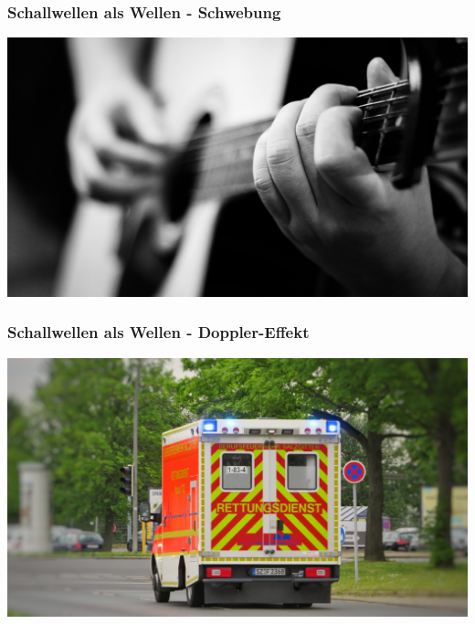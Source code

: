 \documentclass{beamer}
\begin{document}
\begin{frame}
\frametitle{Schallwellen als Wellen - Schwebung}

\begin{center}
\includegraphics[width=\textwidth]{guitar.jpg}
\end{center}


\end{frame}


\begin{frame}
\frametitle{Schallwellen als Wellen - Doppler-Effekt}

\begin{center}
\includegraphics[width=\textwidth]{krankenwagen.jpg}
\end{center}


\end{frame}



\end{document}
